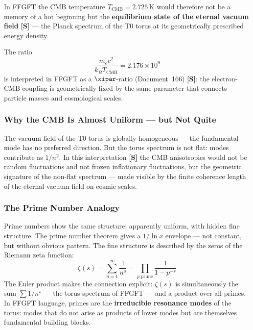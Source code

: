 In FFGFT the CMB temperature $T_\text{CMB} = 2.725\,\text{K}$ would therefore not
be a memory of a hot beginning but the \textbf{equilibrium state of the
eternal vacuum field} \textbf{[S]} — the Planck spectrum of the T0 torus at its
geometrically prescribed energy density.

\begin{foundation}
The ratio
\begin{equation}
    \frac{m_e c^2}{k_B T_\text{CMB}} = 2.176 \times 10^9
\end{equation}
is interpreted in FFGFT as a $\xipar$-ratio (Document~166) \textbf{[S]}:
the electron-CMB coupling is geometrically fixed by the same parameter
that connects particle masses and cosmological scales.
\end{foundation}

\subsubsection*{Why the CMB Is Almost Uniform — but Not Quite}

The vacuum field of the T0 torus is globally homogeneous — the fundamental
mode has no preferred direction. But the torus spectrum is not flat: modes
contribute as $1/n^2$. In this interpretation \textbf{[S]} the CMB anisotropies would not be random
fluctuations and not frozen inflationary fluctuations, but the geometric
signature of the non-flat spectrum — made visible by the finite coherence
length of the eternal vacuum field on cosmic scales.

\subsubsection*{The Prime Number Analogy}

Prime numbers show the same structure: apparently uniform, with hidden
fine structure. The prime number theorem gives a $1/\ln x$ envelope —
not constant, but without obvious pattern. The fine structure is
described by the zeros of the Riemann zeta function:
\begin{equation}
    \zeta(s) = \sum_{n=1}^{\infty} \frac{1}{n^s}
    = \prod_{p\;\text{prime}} \frac{1}{1-p^{-s}}
\end{equation}
The Euler product makes the connection explicit: $\zeta(s)$ is
simultaneously the sum $\sum 1/n^s$ — the torus spectrum of FFGFT —
and a product over all primes. In FFGFT language, primes are the
\textbf{irreducible resonance modes} of the torus: modes that do not
arise as products of lower modes but are themselves fundamental building
blocks.

